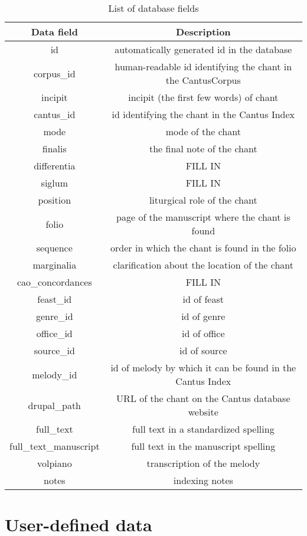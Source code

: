 \begin{table}[h!]
\begin{center}
\begin{tabular}{| c | c |} 

 \hline
 Data field & Description \\
 \hline
 id & automatically generated id in the database \\ 
 corpus\_id & human-readable id identifying the chant in the CantusCorpus \\
 incipit & incipit (the first few words) of chant \\
 cantus\_id & id identifying the chant in the Cantus Index \\
 mode & mode of the chant \\
 finalis & the final note of the chant \\
 differentia & FILL IN \\
 siglum & FILL IN \\
 position & liturgical role of the chant \\
 folio & page of the manuscript where the chant is found \\
 sequence & order in which the chant is found in the folio \\
 marginalia & clarification about the location of the chant \\
 cao\_concordances & FILL IN \\
 feast\_id & id of feast \\
 genre\_id & id of genre \\
 office\_id & id of office \\ 
 source\_id & id of source \\
 melody\_id & id of melody by which it can be found in the Cantus Index \\
 drupal\_path & URL of the chant on the Cantus database website \\
 full\_text & full text in a standardized spelling \\
 full\_text\_manuscript & full text in the manuscript spelling \\
 volpiano & transcription of the melody \\
 notes & indexing notes \\
 \hline

\end{tabular}
\end{center}
\caption{List of database fields}
\end{table}

\section{User-defined data}

